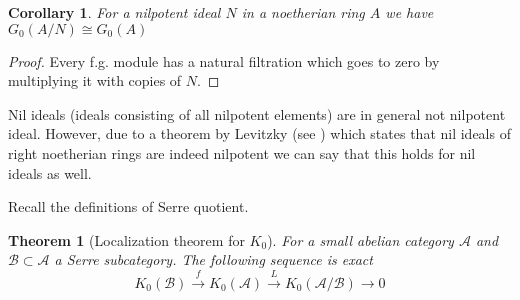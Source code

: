 \documentclass[12pt]{article}
\numberwithin{equation}{section}
\newcounter{dummy} \numberwithin{dummy}{section}
\newtheorem{theorem}[dummy]{Theorem}
\newtheorem{corollary}[dummy]{Corollary}
\begin{document}
	\begin{corollary}
		For a nilpotent ideal $N$ in a noetherian ring $A$ we have $G_0(A/N) \cong G_0(A	)$
	\end{corollary}
	\begin{proof}
		Every f.g. module has a natural filtration which goes to zero by multiplying it with copies of $N$.
	\end{proof}	
	Nil ideals (ideals consisting of all nilpotent elements) are in general not nilpotent ideal. However, due to a theorem by Levitzky (see \cite[Th. 10.30]{lam2001first}) which states that nil ideals of right noetherian rings are indeed nilpotent we can say that this holds for nil ideals as well.
	
	Recall the definitions of Serre quotient.
	\begin{theorem}[Localization theorem for $K_0$]
		 For a small abelian category $\mathcal{A}$ and $\mathcal{B} \subset \mathcal{A}$ a Serre subcategory. The following sequence is exact
		 \[ K_0(\mathcal{B}) \xrightarrow{f} K_0(\mathcal{A}) \xrightarrow{L} K_0(\mathcal{A/B}) \to 0 \]
	\end{theorem}
\end{document}
